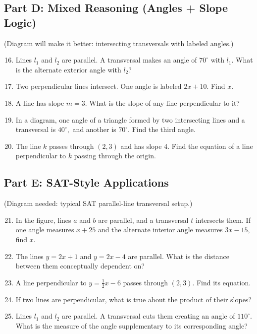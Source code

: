 \documentclass[12pt]{article}
\begin{document}
\subsection*{Part D: Mixed Reasoning (Angles + Slope Logic)}
(Diagram will make it better: intersecting transversals with labeled angles.)

\begin{enumerate}
  \setcounter{enumi}{15}
  \item Lines \(l_1\) and \(l_2\) are parallel. A transversal makes an angle of \(70^\circ\) with \(l_1.\) What is the alternate exterior angle with \(l_2?\)
  \item Two perpendicular lines intersect. One angle is labeled \(2x + 10.\) Find \(x.\)
  \item A line has slope \(m = 3.\) What is the slope of any line perpendicular to it?
  \item In a diagram, one angle of a triangle formed by two intersecting lines and a transversal is \(40^\circ,\) and another is \(70^\circ.\) Find the third angle.
  \item The line \(k\) passes through \((2, 3)\) and has slope 4. Find the equation of a line perpendicular to \(k\) passing through the origin.
\end{enumerate}

\subsection*{Part E: SAT-Style Applications}
(Diagram needed: typical SAT parallel-line transversal setup.)

\begin{enumerate}
  \setcounter{enumi}{20}
  \item In the figure, lines \(a\) and \(b\) are parallel, and a transversal \(t\) intersects them. If one angle measures \(x + 25\) and the alternate interior angle measures \(3x - 15,\) find \(x.\)
  \item The lines \(y = 2x + 1\) and \(y = 2x - 4\) are parallel. What is the distance between them conceptually dependent on?
  \item A line perpendicular to \(y = \tfrac{1}{2}x - 6\) passes through \((2, 3)\). Find its equation.
  \item If two lines are perpendicular, what is true about the product of their slopes?
  \item Lines \(l_1\) and \(l_2\) are parallel. A transversal cuts them creating an angle of \(110^\circ.\) What is the measure of the angle supplementary to its corresponding angle?
\end{enumerate}
\end{document}
